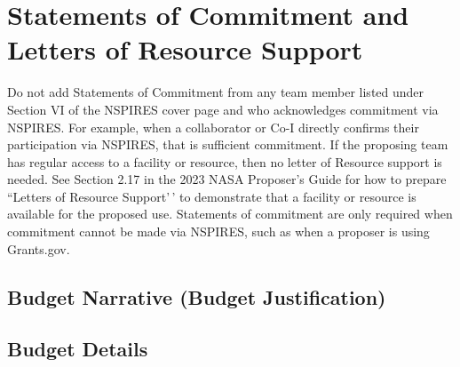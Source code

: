\documentclass[
  letterpaper,
  DIV=11,
  numbers=noendperiod,
  oneside]{scrartcl}
\begin{document}
\section{Statements of Commitment and Letters of Resource
Support}\label{statements-of-commitment-and-letters-of-resource-support}

Do not add Statements of Commitment from any team member listed under
Section VI of the NSPIRES cover page and who acknowledges commitment via
NSPIRES. For example, when a collaborator or Co-I directly confirms
their participation via NSPIRES, that is sufficient commitment. If the
proposing team has regular access to a facility or resource, then no
letter of Resource support is needed. See Section 2.17 in the 2023 NASA
Proposer's Guide for how to prepare ``Letters of Resource Support'\,' to
demonstrate that a facility or resource is available for the proposed
use. Statements of commitment are only required when commitment cannot
be made via NSPIRES, such as when a proposer is using Grants.gov.

\subsection{Budget Narrative (Budget
Justification)}\label{budget-narrative-budget-justification}

\subsection{Budget Details}\label{budget-details}
\end{document}
